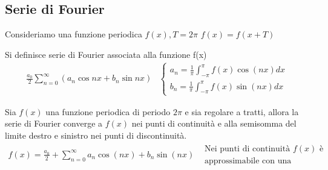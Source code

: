 \subsection{Serie di Fourier}
Consideriamo una funzione periodica $f(x),T=2\pi$ $f(x)=f(x+T)$
\begin{defi}
  Si definisce serie di Fourier associata alla funzione f(x)
  \begin{eqnarray*}
    \frac{a_0}{2}\displaystyle\sum_{n=0}^\infty (a_n\cos nx +b_n\sin nx)
    &\begin{cases}
      a_n=\frac{1}{\pi}\int_{-\pi}^\pi f(x)\cos(nx)dx\\
      b_n=\frac{1}{\pi}\int_{-\pi}^\pi f(x)\sin(nx)dx
    \end{cases}
  \end{eqnarray*}
\end{defi}
\clearpage
\begin{teorema}
  Sia $f(x)$ una funzione periodica di periodo $2\pi$ e sia regolare a tratti, allora
  la serie di Fourier converge a $f(x)$ nei punti di continuità e alla semisomma del
  limite destro e sinistro nei punti di discontinuità.
  \begin{eqnarray*}
    f(x)=\frac{a_0}{2}+\displaystyle\sum_{n=0}^\infty a_n \cos(nx) + b_n \sin(nx)
    & \begin{matrix}
        \text{Nei punti di continuità $f(x)$ è}\\
        \text{approssimabile con una serie di funzioni trigonometriche.}
      \end{matrix}
  \end{eqnarray*}
\end{teorema}

